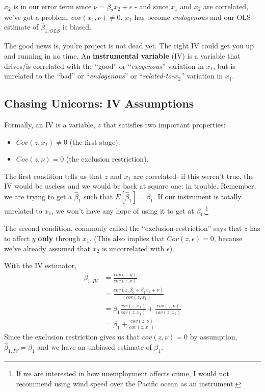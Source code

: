 \documentclass[
]{article}
\begin{document}
\(x_2\) is in our error term since \(\nu=\beta_2x_2+\epsilon\) - and
since \(x_1\) and \(x_2\) are correlated, we've got a problem:
\(cov(x_1,\nu)\neq0\). \(x_1\) has become \textit{endogenous} and our
OLS estimate of \(\hat{\beta}_{1,OLS}\) is biased.

The good news is, you're project is not dead yet. The right IV could get
you up and running in no time. An \textbf{instrumental variable} (IV) is
a variable that drives/is correlated with the ``good'' or
``\textit{exogenous}'' variation in \(x_1\), but is unrelated to the
``bad'' or ``\textit{endogenous}'' or ``\textit{related-to-$x_2$}''
variation in \(x_1\).

\subsection{Chasing Unicorns: IV Assumptions}

Formally, an IV is a variable, \(z\) that satisfies two important
properties:

\begin{itemize}
\item $Cov(z, x_1)\neq 0$ (the first stage).
\item $Cov(z, \nu)= 0$ (the exclusion restriction). 
\end{itemize}

The first condition tells us that \(z\) and \(x_1\) are correlated- if
this weren't true, the IV would be useless and we would be back at
square one: in trouble. Remember, we are trying to get a
\(\hat{\beta}_1\) such that \(E[\hat{\beta}_1]=\beta_1\). If our
instrument is totally unrelated to \(x_1\), we won't have any hope of
using it to get at \(\beta_1\).\footnote{If we are interested in how
  unemployment affects crime, I would not recommend using wind speed
  over the Pacific ocean as an instrument.}

The second condition, commonly called the ``exclusion restriction'' says
that \(z\) has to affect \(y\) \textbf{only} through \(x_1\). (This also
implies that \(Cov(z,\epsilon)=0\), because we've already assumed that
\(x_2\) is uncorrelated with \(\epsilon\)).

With the IV estimator, \[
\begin{aligned}
\hat{\beta}_{1,IV}&=\frac{cov(z,y)}{cov(z,x)}\\
&=\frac{cov(z,\beta_0+\beta_1x_1+\nu)}{cov(z,x_1)}\\
&=\beta_1\frac{cov(z,x_1)}{cov(z,x_1)}+\frac{cov(z,\nu)}{cov(z,x_1)}\\
&=\beta_1+\frac{cov(z,\nu)}{cov(z,x_1)}.
\end{aligned}
\] Since the exclusion restriction gives us that \(cov(z, \nu)= 0\) by
assumption, \(\hat{\beta}_{1,IV}=\beta_1\) and we have an unbiased
estimate of \(\beta_1\).
\end{document}
